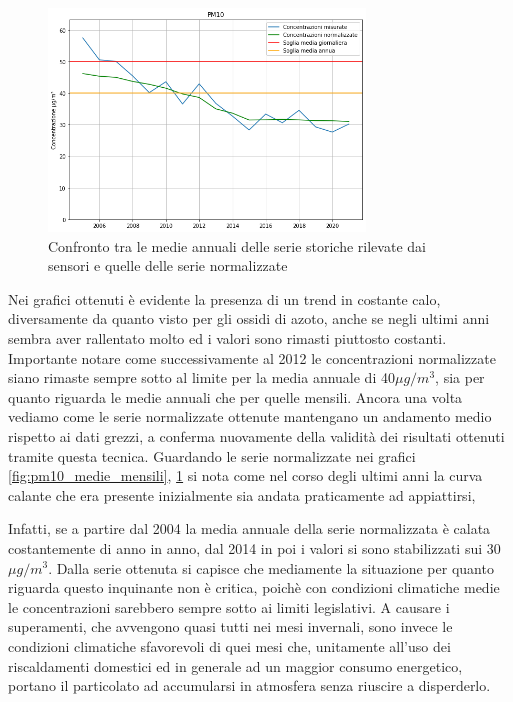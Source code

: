 \documentclass[a4paper]{report}
\begin{document}
\begin{figure}[h]
\centering
\includegraphics[width=0.75\textwidth]{pm10_medie_annuali}
\caption{Confronto tra le medie annuali delle serie storiche rilevate dai sensori e quelle delle serie normalizzate}
\label{fig:pm10_medie_annuali}
\end{figure}

Nei grafici ottenuti è evidente la presenza di un trend in costante calo, diversamente da quanto visto per gli ossidi di azoto, anche se negli ultimi anni sembra aver rallentato molto ed i valori sono rimasti piuttosto costanti.
Importante notare come successivamente al 2012 le concentrazioni normalizzate siano rimaste sempre sotto al limite per la media annuale di 40$\mu g/m^3$, sia per quanto riguarda le medie annuali che per quelle mensili.
Ancora una volta vediamo come le serie normalizzate ottenute mantengano un andamento medio rispetto ai dati grezzi, a conferma nuovamente della validità dei risultati ottenuti tramite questa tecnica.
Guardando le serie normalizzate nei grafici \ref{fig:pm10_medie_mensili}, \ref{fig:pm10_medie_annuali} si nota come nel corso degli ultimi anni la curva calante che era presente inizialmente sia andata praticamente ad appiattirsi,

Infatti, se a partire dal 2004 la media annuale della serie normalizzata è calata costantemente di anno in anno, dal 2014 in poi i valori si sono stabilizzati sui 30$\mu g/m^3$. Dalla serie ottenuta si capisce che mediamente la situazione per quanto riguarda questo inquinante non è critica, poichè con condizioni climatiche medie le concentrazioni sarebbero sempre sotto ai limiti legislativi. A causare i superamenti, che avvengono quasi tutti nei mesi invernali, sono invece le condizioni climatiche sfavorevoli di quei mesi che, unitamente all'uso dei riscaldamenti domestici ed in generale ad un maggior consumo energetico, portano il particolato ad accumularsi in atmosfera senza riuscire a disperderlo.
\end{document}
